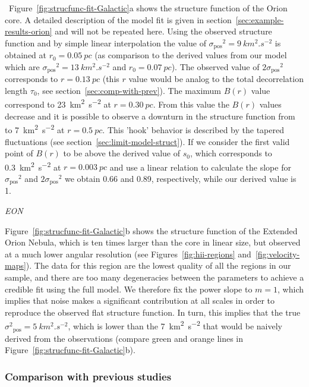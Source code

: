 \documentclass[fleqn,usenatbib, useAMS, a4paper]{mnras}
\newcommand\pos{\ensuremath{_{\mathrm{pos}}}}
\begin{document}
\
Figure~\ref{fig:strucfunc-fit-Galactic}a shows the structure function of the Orion core.
A detailed description of the model fit is given in section~\ref{sec:example-results-orion} and will not be repeated here.
Using the observed structure function and by simple linear interpolation the value of \(\sigma\pos^2 = \SI{9}{km^{2}.s^{-2}}\) is obtained at \(r_0 = \SI{0.05}{pc} \) (as comparison to the derived values from our model which are \(\sigma\pos^2 = \SI{13}{km^{2}.s^{-2}}\) and \(r_0 = \SI{0.07}{pc} \)).
The observed value of \(2\sigma\pos^2\) corresponds to \(r = \SI{0.13}{pc} \) (this \(r\) value would be analog to the total decorrelation length \(\tau_0\), see section~\ref{sec:comp-with-prev}). 
The maximum \(B(r)\) value correspond to \SI{23}{km^{2}.s^{-2}} at \(r = \SI{0.30}{pc}\).
From this value the \(B(r)\) values decrease and it is possible to observe a downturn in the structure function from to \SI{7}{km^{2}.s^{-2}} at \(r =  \SI{0.5}{pc}\). 
This 'hook' behavior is described by the tapered fluctuations (see section~\ref{sec:limit-model-struct}).
If we consider the first valid point of \(B(r)\) to be above the derived value of \(s_0\), which corresponds to \SI{0.3}{km^{2}.s^{-2}} at \(r = \SI{0.003}{pc} \) and use a linear relation to calculate the slope for \(\sigma\pos^2\) and \(2\sigma\pos^2\) we obtain \num{0.66} and \num{0.89}, respectively, while our derived value is \num{1}.

\textit{EON}

Figure~\ref{fig:strucfunc-fit-Galactic}b shows the structure function of the Extended Orion Nebula, which is ten times larger than the core in linear size,
but observed at a much lower angular resolution
(see Figures~\ref{fig:hii-regions} and~\ref{fig:velocity-maps}).
The data for this region are the lowest quality of all the regions in
our sample, and there are too many degeneracies between the parameters
to achieve a credible fit using the full model.
We therefore fix the power slope to \(m = 1\),
which implies that noise makes a significant contribution at all scales
in order to reproduce the observed flat structure function.
In turn, this implies that the true \(\sigma^2\pos = \SI{5}{km^2.s^{-2}}\),
which is lower than the \SI{7}{km^2.s^{-2}}
that would be naively derived from the observations
(compare green and orange lines in Figure~\ref{fig:strucfunc-fit-Galactic}b).


\subsubsection{Comparison with previous studies}
\label{sec:comparison-orion}
\end{document}
